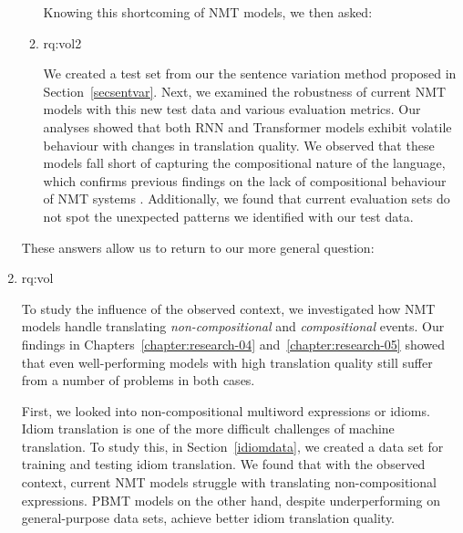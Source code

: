 \begin{enumerate}[label=\textbf{Research Question \arabic*:},ref={RQ\arabic*},wide = 0pt]
\begin{enumerate}[label=\textbf{RQ3.\arabic* },wide = 0pt, leftmargin=2em]
Knowing this shortcoming of NMT models, we then asked:

\item \acl{rq:vol2} \label{rq:vol2}

\medskip

\noindent We created a test set from our the sentence variation method proposed in Section~\ref{secsentvar}. 
Next, we examined the robustness of current NMT models with this new test data and various evaluation metrics. 
Our analyses showed that both RNN and Transformer models exhibit volatile behaviour with changes in translation quality.
We observed that these models fall short of capturing the compositional nature of the language, which confirms previous findings on the lack of compositional behaviour of NMT systems \citep{886a37b5fc2f43449e4bca3b5557e3ae}.
Additionally, we found that current evaluation sets do not spot the unexpected patterns we identified with our test data. 


\end{enumerate}

\medskip

These answers allow us to return to our more general question:

\item \acl{rq:vol} \label{rq:vol}

\medskip

\noindent 
To study the influence of the observed context, we investigated how NMT models handle translating \textit{non-compositional} and \textit{compositional} events.
Our findings in Chapters~\ref{chapter:research-04} and~\ref{chapter:research-05} showed that even well-performing models with high translation quality still suffer from a number of problems in both cases. 

First, we looked into non-compositional multiword expressions or idioms.
Idiom translation is one of the more difficult challenges of machine translation. 
To study this, in Section~\ref{idiomdata}, we created a data set for training and testing idiom translation.
We found that with the observed context, current NMT models struggle with translating non-compositional expressions. PBMT models on the other hand, despite underperforming on general-purpose data sets, achieve better idiom translation quality.


\end{enumerate}
